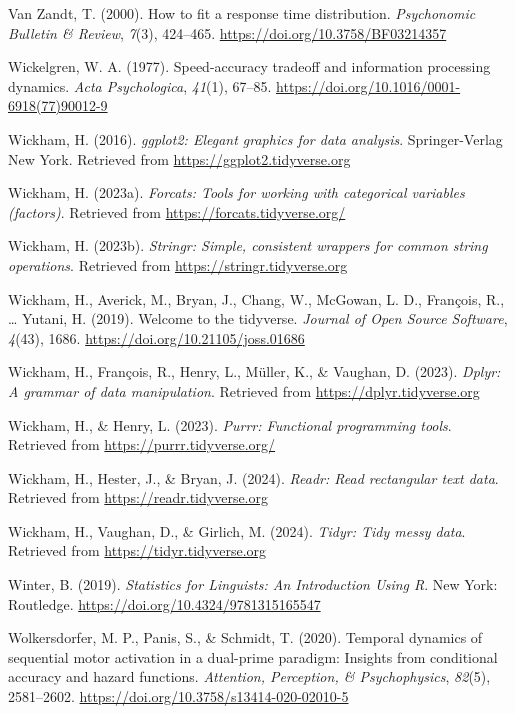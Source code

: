 \documentclass[
  man, donotrepeattitle,floatsintext]{apa6}
\newlength{\cslhangindent}
\newenvironment{CSLReferences}[2] %
 {\begin{list}{}{%
  \setlength{\itemindent}{0pt}
  \setlength{\leftmargin}{0pt}
  \setlength{\parsep}{0pt}
  \ifodd #1
   \setlength{\leftmargin}{\cslhangindent}
   \setlength{\itemindent}{-1\cslhangindent}
  \fi
  \setlength{\itemsep}{#2\baselineskip}}}
 {\end{list}}
\begin{document}
\begin{CSLReferences}{1}{0}
Van Zandt, T. (2000). How to fit a response time distribution. \emph{Psychonomic Bulletin \& Review}, \emph{7}(3), 424--465. \url{https://doi.org/10.3758/BF03214357}

Wickelgren, W. A. (1977). Speed-accuracy tradeoff and information processing dynamics. \emph{Acta Psychologica}, \emph{41}(1), 67--85. \url{https://doi.org/10.1016/0001-6918(77)90012-9}

Wickham, H. (2016). \emph{ggplot2: Elegant graphics for data analysis}. Springer-Verlag New York. Retrieved from \url{https://ggplot2.tidyverse.org}

Wickham, H. (2023a). \emph{Forcats: Tools for working with categorical variables (factors)}. Retrieved from \url{https://forcats.tidyverse.org/}

Wickham, H. (2023b). \emph{Stringr: Simple, consistent wrappers for common string operations}. Retrieved from \url{https://stringr.tidyverse.org}

Wickham, H., Averick, M., Bryan, J., Chang, W., McGowan, L. D., François, R., \ldots{} Yutani, H. (2019). Welcome to the {tidyverse}. \emph{Journal of Open Source Software}, \emph{4}(43), 1686. \url{https://doi.org/10.21105/joss.01686}

Wickham, H., François, R., Henry, L., Müller, K., \& Vaughan, D. (2023). \emph{Dplyr: A grammar of data manipulation}. Retrieved from \url{https://dplyr.tidyverse.org}

Wickham, H., \& Henry, L. (2023). \emph{Purrr: Functional programming tools}. Retrieved from \url{https://purrr.tidyverse.org/}

Wickham, H., Hester, J., \& Bryan, J. (2024). \emph{Readr: Read rectangular text data}. Retrieved from \url{https://readr.tidyverse.org}

Wickham, H., Vaughan, D., \& Girlich, M. (2024). \emph{Tidyr: Tidy messy data}. Retrieved from \url{https://tidyr.tidyverse.org}

Winter, B. (2019). \emph{Statistics for {Linguists}: {An Introduction Using R}}. New York: Routledge. \url{https://doi.org/10.4324/9781315165547}

Wolkersdorfer, M. P., Panis, S., \& Schmidt, T. (2020). Temporal dynamics of sequential motor activation in a dual-prime paradigm: {Insights} from conditional accuracy and hazard functions. \emph{Attention, Perception, \& Psychophysics}, \emph{82}(5), 2581--2602. \url{https://doi.org/10.3758/s13414-020-02010-5}

\end{CSLReferences}
\end{document}
